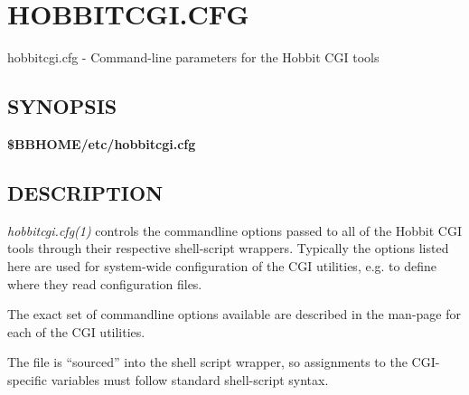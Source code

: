  
%
%
\newpage
\section{HOBBITCGI.CFG}
 hobbitcgi.cfg - Command-line parameters for the Hobbit CGI tools 

 
\subsection{SYNOPSIS}
\textbf{\$BBHOME/etc/hobbitcgi.cfg}


 
\subsection{DESCRIPTION}
\emph{hobbitcgi.cfg(1)}
 controls the commandline options passed to all of the Hobbit CGI tools through their respective shell-script wrappers. Typically the options listed here are used for system-wide configuration of the CGI utilities, e.g. to define where they read configuration files. 

  The exact set of commandline options available are described in the man-page for each of the CGI utilities. 


  The file is ``sourced'' into the shell script wrapper, so assignments to the CGI-specific variables must follow standard shell-script syntax. 


 
